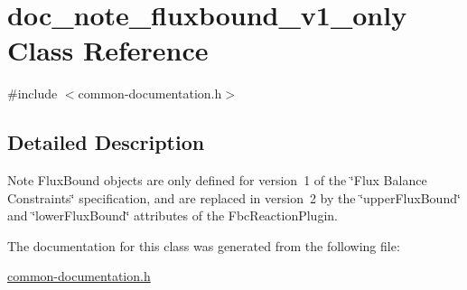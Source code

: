 \hypertarget{classdoc__note__fluxbound__v1__only}{}\section{doc\+\_\+note\+\_\+fluxbound\+\_\+v1\+\_\+only Class Reference}
\label{classdoc__note__fluxbound__v1__only}


{\ttfamily \#include $<$common-\/documentation.\+h$>$}



\subsection{Detailed Description}
\begin{DoxyNote}{Note}
Flux\+Bound objects are only defined for version~1 of the \char`\"{}\+Flux Balance Constraints\char`\"{} specification, and are replaced in version~2 by the \char`\"{}upper\+Flux\+Bound\char`\"{} and \char`\"{}lower\+Flux\+Bound\char`\"{} attributes of the Fbc\+Reaction\+Plugin. 
\end{DoxyNote}


The documentation for this class was generated from the following file\+:\begin{DoxyCompactItemize}
\item 
\hyperlink{common-documentation_8h}{common-\/documentation.\+h}\end{DoxyCompactItemize}
